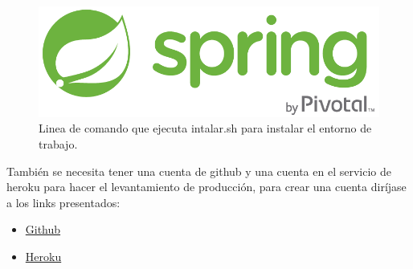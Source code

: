 \begin{figure}[H]
  \centering
  \includegraphics[width=0.1\linewidth]{images/tecnologias/spring.png}
  \caption{Linea de comando que ejecuta intalar.sh para instalar el entorno de trabajo.}
\end{figure}


También se necesita tener una cuenta de github y una cuenta en el servicio de heroku para hacer el levantamiento de producción, para crear una cuenta diríjase a los links presentados:
\begin{itemize}
  \item \href{https://codigofacilito.com/articulos/como-crear-una-cuenta-y-un-repo-en-github}{Github}
  \item \href{https://signup.heroku.com/dc}{Heroku}
\end{itemize}
